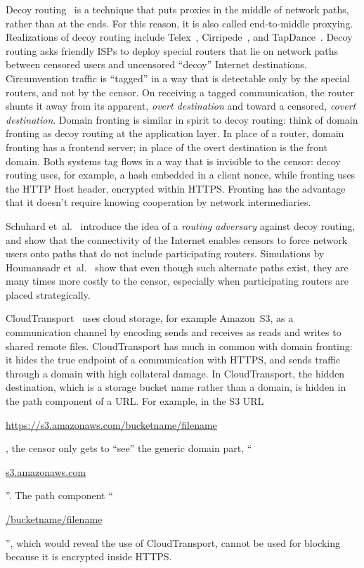 \documentclass[conference]{IEEEtran}
\def\urll#1{\begin{NoHyper}\url{#1}\end{NoHyper}}
\begin{document}
Decoy routing~\cite{decoyrouting}
is a technique that puts
proxies in the middle of network paths, rather than at the ends.
For this reason, it is also called end-to-middle proxying.
Realizations of decoy routing include Telex~\cite{telex},
Cirripede~\cite{cirripede}, and TapDance~\cite{tapdance}.
Decoy routing asks friendly ISPs to deploy special routers that lie
on network paths between censored users and uncensored ``decoy'' Internet destinations.
Circumvention traffic is ``tagged'' in a way that is detectable only
by the special routers, and not by the censor.
On receiving a tagged communication, the router shunts it away from its apparent, \emph{overt destination}
and toward a censored, \emph{covert destination}.
Domain fronting is similar in spirit to decoy routing:
think of domain fronting as decoy routing at the application layer.
In place of a router, domain fronting has a frontend server;
in place of the overt destination is the front domain.
Both systems tag flows in a way that is invisible to the censor:
decoy routing uses, for example, a hash embedded in a client nonce,
while fronting uses the HTTP Host header, encrypted within HTTPS.
Fronting has the advantage that it doesn't require knowing cooperation by network intermediaries.

Schuhard et~al.~\cite{ccs2012-decoys}
introduce the idea of a \emph{routing adversary} against decoy routing,
and show that the connectivity of the Internet enables
censors to force network users onto paths that do not include participating routers.
Simulations by Houmansadr et~al.~\cite{nodirectionhome}
show that even though such alternate paths exist,
they are many times more costly to the censor,
especially when participating routers are placed strategically.

CloudTransport~\cite{cloudtransport} uses cloud storage, for example Amazon~S3,
as a communication channel by encoding sends and receives as reads and writes to shared remote files.
CloudTransport has much in common with domain fronting:
it hides the true endpoint of a communication with HTTPS,
and sends traffic through a domain with high collateral damage.
In CloudTransport, the hidden destination, which is a storage bucket name rather than a domain,
is hidden in the path component of a URL.
For example, in the S3 URL
\urll{https://s3.amazonaws.com/bucketname/filename},
the censor only gets to ``see'' the generic domain part, ``\urll{s3.amazonaws.com}''.
The path component ``\urll{/bucketname/filename}'',
which would reveal the use of CloudTransport,
cannot be used for blocking because it is encrypted inside HTTPS.
\end{document}
